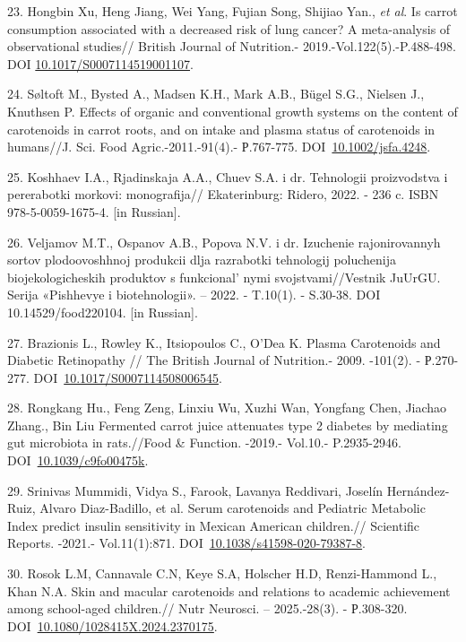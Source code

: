 23. Hongbin Xu, Heng Jiang, Wei Yang, Fujian Song, Shijiao Yan.,
\emph{et al}. Is carrot consumption associated with a decreased risk of
lung cancer? A meta-analysis of observational studies// British Journal
of Nutrition.- 2019.-Vol.122(5).-P.488-498. DOI
\href{https://doi.org/10.1017/s0007114519001107}{10.1017/S0007114519001107}.

24. Søltoft M., Bysted A., Madsen K.H., Mark A.B., Bügel S.G., Nielsen
J., Knuthsen P. Effects of organic and conventional growth systems on
the content of carotenoids in carrot roots, and on intake and plasma
status of carotenoids in humans//J. Sci. Food Agric.-2011.-91(4).-
Р.767-775.
DOI~\href{https://doi.org/10.1002/jsfa.4248}{10.1002/jsfa.4248}.

25. Koshhaev I.A., Rjadinskaja A.A., Chuev S.A. i dr. Tehnologii
proizvodstva i pererabotki morkovi: monografija// Ekaterinburg: Ridero,
2022. - 236 c. ISBN 978-5-0059-1675-4. {[}in Russian{]}.

26. Veljamov M.T., Ospanov A.B., Popova N.V. i dr. Izuchenie
rajonirovannyh sortov plodoovoshhnoj produkcii dlja razrabotki
tehnologij poluchenija biojekologicheskih produktov s
funkcional' nymi svojstvami//Vestnik JuUrGU. Serija
«Pishhevye i biotehnologii». -- 2022. - T.10(1). - S.30-38. DOI
10.14529/food220104. {[}in Russian{]}.

27. Brazionis L., Rowley K., Itsiopoulos C., O'Dea K. Plasma Carotenoids
and Diabetic Retinopathy // The British Journal of Nutrition.- 2009.
-101(2). - Р.270-277.
DOI~\href{https://doi.org/10.1017/s0007114508006545}{10.1017/S0007114508006545}.

28. Rongkang Hu., Feng Zeng, Linxiu Wu, Xuzhi Wan, Yongfang Chen,
Jiachao Zhang., Bin Liu Fermented carrot juice attenuates type 2
diabetes by mediating gut microbiota in rats.//Food \& Function. -2019.-
Vol.10.- P.2935-2946.
DOI~\href{https://doi.org/10.1039/c9fo00475k}{10.1039/c9fo00475k}.

29. Srinivas Mummidi, Vidya S., Farook, Lavanya Reddivari, Joselín
Hernández-Ruiz, Alvaro Diaz-Badillo, et al. Serum carotenoids and
Pediatric Metabolic Index predict insulin sensitivity in Mexican
American children.// Scientific Reports. -2021.- Vol.11(1):871.
DOI~\href{https://doi.org/10.1038/s41598-020-79387-8}{10.1038/s41598-020-79387-8}.

30. Rosok L.M, Cannavale C.N, Keye S.A, Holscher H.D, Renzi-Hammond L.,
Khan N.A. Skin and macular carotenoids and relations to academic
achievement among school-aged children.// Nutr Neurosci. -- 2025.-28(3).
- Р.308-320.
DOI~\href{https://doi.org/10.1080/1028415x.2024.2370175}{10.1080/1028415X.2024.2370175}.

